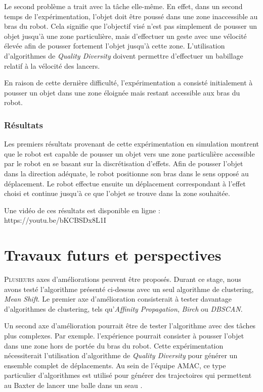 \documentclass{llncs}
\begin{document}
Le second problème a trait avec la tâche elle-même.
En effet, dans un second temps de l'expérimentation, l'objet doit être poussé dans une zone inaccessible au bras du robot.
Cela signifie que l'objectif visé n'est pas simplement de pousser  un objet jusqu'à une zone particulière, mais d'effectuer un geste avec une vélocité élevée afin de pousser fortement l'objet jusqu'à cette zone.
L'utilisation d'algorithmes de \textit{Quality Diversity} doivent permettre d'effectuer un babillage relatif à la vélocité des lancers.

En raison de cette dernière difficulté, l'expérimentation a consisté initialement à pousser un objet dans une zone éloignée mais restant accessible aux bras du robot.





\subsubsection{Résultats}

Les premiers résultats provenant de cette expérimentation en simulation montrent que le robot est capable de pousser un objet vers une zone particulière accessible par le robot en se basant sur la discrétisation d'effets.
Afin de pousser l'objet dans la direction adéquate, le robot positionne son bras dans le sens opposé au déplacement.
Le robot effectue ensuite un déplacement correspondant à l'effet choisi et continue jusqu'à ce que l'objet se trouve dans la zone souhaitée.

Une vidéo de ces résultats est disponible en ligne : https://youtu.be/bKCBSDx8L1I





\section{Travaux futurs et perspectives}

\lettrine{P}{lusieurs} axes d'améliorations peuvent être proposés.
Durant ce stage, nous avons testé l'algorithme présenté ci-dessus avec un seul algorithme de clustering, \textit{Mean Shift}.
Le premier axe d'amélioration consisterait à tester davantage d'algorithmes de clustering, tels qu'\textit{Affinity Propagation}, \textit{Birch} ou \textit{DBSCAN}.

Un second axe d'amélioration pourrait être de tester l'algorithme avec des tâches plus complexes.
Par exemple. l'expérience pourrait consister à pousser l'objet dans une zone hors de portée du bras du robot.
Cette expérimentation nécessiterait l'utilisation d'algorithme de \textit{Quality Diversity} \cite{Pugh2016} pour générer un ensemble complet de déplacements.
Au sein de l'équipe AMAC, ce type particulier d'algorithmes est utilisé pour générer des trajectoires qui permettent au Baxter de lancer une balle dans un seau \cite{Kim2017}. 
\end{document}
